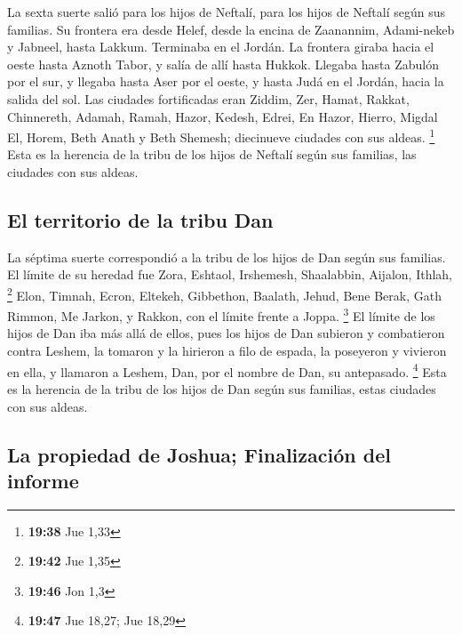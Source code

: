 \begin{paracol}{2}
 La sexta suerte salió para los hijos de Neftalí, para
los hijos de Neftalí según sus familias.  Su frontera era
desde Helef, desde la encina de Zaanannim, Adami-nekeb y Jabneel, hasta
Lakkum. Terminaba en el Jordán.  La frontera giraba hacia
el oeste hasta Aznoth Tabor, y salía de allí hasta Hukkok. Llegaba hasta
Zabulón por el sur, y llegaba hasta Aser por el oeste, y hasta Judá en
el Jordán, hacia la salida del sol.  Las ciudades
fortificadas eran Ziddim, Zer, Hamat, Rakkat, Chinnereth,
 Adamah, Ramah, Hazor,  Kedesh, Edrei, En
Hazor,  Hierro, Migdal El, Horem, Beth Anath y Beth
Shemesh; diecinueve ciudades con sus aldeas. \footnote{\textbf{19:38}
  Jue 1,33}  Esta es la herencia de la tribu de los hijos
de Neftalí según sus familias, las ciudades con sus aldeas.

\hypertarget{el-territorio-de-la-tribu-dan}{%
\subsection{El territorio de la tribu
Dan}\label{el-territorio-de-la-tribu-dan}}

 La séptima suerte correspondió a la tribu de los hijos
de Dan según sus familias.  El límite de su heredad fue
Zora, Eshtaol, Irshemesh,  Shaalabbin, Aijalon, Ithlah,
\footnote{\textbf{19:42} Jue 1,35}  Elon, Timnah, Ecron,
 Eltekeh, Gibbethon, Baalath,  Jehud, Bene
Berak, Gath Rimmon,  Me Jarkon, y Rakkon, con el límite
frente a Joppa. \footnote{\textbf{19:46} Jon 1,3}  El
límite de los hijos de Dan iba más allá de ellos, pues los hijos de Dan
subieron y combatieron contra Leshem, la tomaron y la hirieron a filo de
espada, la poseyeron y vivieron en ella, y llamaron a Leshem, Dan, por
el nombre de Dan, su antepasado. \footnote{\textbf{19:47} Jue 18,27; Jue
  18,29}  Esta es la herencia de la tribu de los hijos de
Dan según sus familias, estas ciudades con sus aldeas.

\hypertarget{la-propiedad-de-joshua-finalizaciuxf3n-del-informe}{%
\subsection{La propiedad de Joshua; Finalización del
informe}\label{la-propiedad-de-joshua-finalizaciuxf3n-del-informe}}


\end{paracol}
